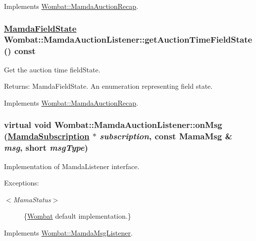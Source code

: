 Implements \hyperlink{classWombat_1_1MamdaAuctionRecap_b9fe8043eff51c5319bd348861da58cc}{Wombat::Mamda\-Auction\-Recap}.\hypertarget{classWombat_1_1MamdaAuctionListener_62f24f47ce07200543881e47e8ff100f}{
\subsubsection[getAuctionTimeFieldState]{\setlength{\rightskip}{0pt plus 5cm}\hyperlink{namespaceWombat_93aac974f2ab713554fd12a1fa3b7d2a}{Mamda\-Field\-State} Wombat::Mamda\-Auction\-Listener::get\-Auction\-Time\-Field\-State () const}}
\label{classWombat_1_1MamdaAuctionListener_62f24f47ce07200543881e47e8ff100f}


Get the auction time field\-State. 

\begin{Desc}
\item[Returns:]Mamda\-Field\-State. An enumeration representing field state. \end{Desc}


Implements \hyperlink{classWombat_1_1MamdaAuctionRecap_9acb736c81b7688a11c12295f6c16597}{Wombat::Mamda\-Auction\-Recap}.\hypertarget{classWombat_1_1MamdaAuctionListener_55aa468360f3612650a7d4dbc694cf9f}{
\subsubsection[onMsg]{\setlength{\rightskip}{0pt plus 5cm}virtual void Wombat::Mamda\-Auction\-Listener::on\-Msg (\hyperlink{classWombat_1_1MamdaSubscription}{Mamda\-Subscription} $\ast$ {\em subscription}, const Mama\-Msg \& {\em msg}, short {\em msg\-Type})}}
\label{classWombat_1_1MamdaAuctionListener_55aa468360f3612650a7d4dbc694cf9f}


Implementation of Mamda\-Listener interface. 

\par
 \begin{Desc}
\item[Exceptions:]
\begin{description}
\item[{\em $<$Mama\-Status$>$}]\{\hyperlink{namespaceWombat}{Wombat} default implementation.\} \end{description}
\end{Desc}


Implements \hyperlink{classWombat_1_1MamdaMsgListener_c700829ebcce095b95b8b67b39a1c67d}{Wombat::Mamda\-Msg\-Listener}.